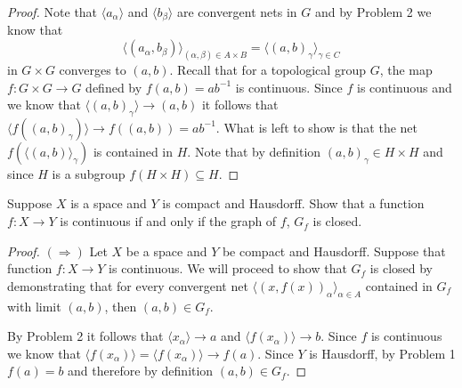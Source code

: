 \documentclass[minion]{homework651}
\begin{document}
\begin{problems}
\begin{proof}
    
    Note that $\langle a_\alpha\rangle$ and $\langle b_\beta\rangle$ are convergent 
    nets in $G$ and by Problem 2 we know that 
    \begin{equation*}
        \langle (a_\alpha, b_\beta) \rangle_{(\alpha, \beta) \in A \times B} = \langle (a, b)_\gamma \rangle_{\gamma \in C}
    \end{equation*}
    in $G \times G$ converges to $(a, b)$.
    Recall that for a topological group $G$, the map $f: G \times G \to G$ defined by $f(a, b) = ab^{-1}$ is continuous. Since $f$ is continuous and we know that 
    $\langle (a, b)_\gamma \rangle \to (a,b)$ it follows that $\langle f((a, b)_\gamma) \rangle \to f((a,b)) = ab^{-1}$. What is left to show is that the net $f(\langle (a, b) \rangle_\gamma)$ is 
    contained in $H$. Note that by definition $(a, b)_\gamma \in H \times H$ and since $H$ is a subgroup $f(H \times H) \subseteq H$. 

    
\end{proof}









\problem Suppose $X$ is a space and $Y$ is compact and Hausdorff.
Show that a function $f:X\rightarrow Y$ is continuous if and only if
the graph of $f$, $G_f$ is closed.

\begin{proof} $(\Rightarrow)$ Let $X$ be a space and $Y$ be compact and Hausdorff. Suppose that function $f:X\rightarrow Y$ is continuous.
    We will proceed to show that $G_f$ is closed by demonstrating that for every convergent net $\langle (x, f(x))_\alpha \rangle_{\alpha \in A}$
    contained in $G_f$ with limit $(a,b)$, then $(a, b) \in G_f$. 

    By Problem 2 it follows that $\langle x_\alpha \rangle \to a$ and $\langle f(x_\alpha) \rangle \to b$. Since $f$ is continuous 
    we know that $\langle f(x_\alpha) \rangle = \langle f(x_\alpha) \rangle \to f(a)$. Since $Y$ is Hausdorff, by Problem 1 $f(a) = b$ and therefore 
    by definition $(a, b) \in G_f$.     
\end{proof}



\end{problems}
\end{document}
